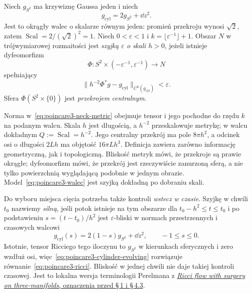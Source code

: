 \begin{definicja}
\label{def:poincare3-neck}
Niech $g_{S^2}$ ma krzywiznę Gaussa jeden i niech
\begin{equation}\label{eq:poincare3-cylinder-unit}
 g_{\mathrm{cyl}}=2g_{S^2}+\dd z^2.
\end{equation}
Jest to okrągły walec o skalarze równym jeden:
promień przekroju wynosi $\sqrt2$, zatem
$\operatorname{Scal}=2/(\sqrt2)^2=1$.
Niech $0<\varepsilon<1$ i
$k=\lfloor\varepsilon^{-1}\rfloor+1$.
Obszar $N$ w trójwymiarowej rozmaitości jest
\emph{szyjką $\varepsilon$ o skali $h>0$},
jeżeli istnieje dyfeomorfizm
\[
 \Phi:S^2\times(-\varepsilon^{-1},
                       \varepsilon^{-1})\longrightarrow N
\]
spełniający
\begin{equation}\label{eq:poincare3-neck-metric}
 \bigl\|h^{-2}\Phi^*g-g_{\mathrm{cyl}}
 \bigr\|_{C^k(g_{\mathrm{cyl}})}<\varepsilon.
\end{equation}
Sfera $\Phi(S^2\times\{0\})$ jest
\emph{przekrojem centralnym}.
\end{definicja}

Norma w~\eqref{eq:poincare3-neck-metric} obejmuje
tensor i jego pochodne do rzędu $k$ na podanym
walcu. Skala $h$ jest długością, a $h^{-2}$
przeskalowuje metrykę; w walcu dokładnym
$Q:=\operatorname{Scal}=h^{-2}$.
Jego centralny przekrój ma pole $8\pi h^2$,
a odcinek osi o długości $2Lh$ ma objętość
$16\pi Lh^3$.
Definicja zawiera zarówno informację geometryczną,
jak i topologiczną. Bliskość metryk mówi, że
przekroje są prawie okrągłe; dyfeomorfizm mówi,
że przekrój jest rzeczywiście zanurzoną sferą,
a nie tylko powierzchnią wyglądającą podobnie
w jednym obrazie. Model~\eqref{eq:poincare3-walec}
jest szyjką dokładną po dobraniu skali.

Do wyboru miejsca cięcia potrzeba także kontroli
\emph{wstecz w czasie}. Szyjkę w chwili $t_0$
nazwiemy \emph{silną}, jeśli potok istnieje na
tym obszarze dla $t_0-h^2\leq t\leq t_0$
i po podstawieniu $s=(t-t_0)/h^2$ jest
$\varepsilon$-bliski w normach przestrzennych
i czasowych walcowi
\begin{equation}\label{eq:poincare3-cylinder-evolving}
 g_{\mathrm{cyl}}(s)
 =2(1-s)g_{S^2}+\dd z^2,
 \qquad -1\leq s\leq0.
\end{equation}
Istotnie, tensor Ricciego tego iloczynu to
$g_{S^2}$ w kierunkach sferycznych i zero
wzdłuż osi, więc~\eqref{eq:poincare3-cylinder-evolving}
rozwiązuje równanie~\eqref{eq:poincare3-ricci}.
Bliskość w jednej chwili nie daje takiej
kontroli czasowej. Jest to lokalna wersja
terminologii Perelmana z
\href{https://arxiv.org/html/math/0303109}
{\emph{Ricci flow with surgery on three-manifolds},
oznaczenia przed \S\,1 i \S\,4.3}.

